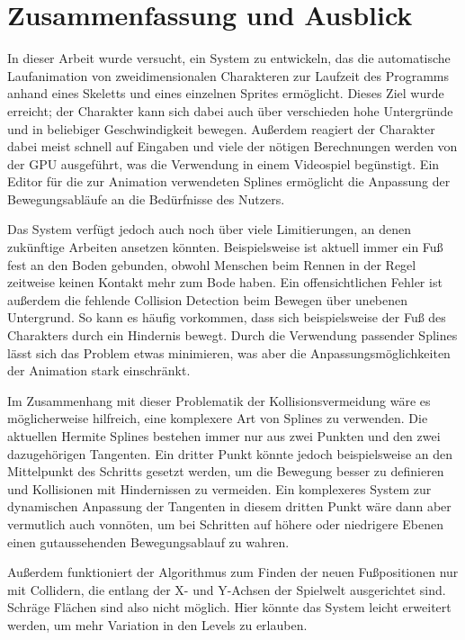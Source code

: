 \chapter{Zusammenfassung und Ausblick} \label{zusammenfassung}
In dieser Arbeit wurde versucht, ein System zu entwickeln, das die automatische Laufanimation von zweidimensionalen Charakteren zur Laufzeit des Programms anhand eines Skeletts und eines einzelnen Sprites ermöglicht. Dieses Ziel wurde erreicht; der Charakter kann sich dabei auch über verschieden hohe Untergründe und in beliebiger Geschwindigkeit bewegen. Außerdem reagiert der Charakter dabei meist schnell auf Eingaben und viele der nötigen Berechnungen werden von der GPU ausgeführt, was die Verwendung in einem Videospiel begünstigt. Ein Editor für die zur Animation verwendeten Splines ermöglicht die Anpassung der Bewegungsabläufe an die Bedürfnisse des Nutzers.

Das System verfügt jedoch auch noch über viele Limitierungen, an denen zukünftige Arbeiten ansetzen könnten. Beispielsweise ist aktuell immer ein Fuß fest an den Boden gebunden, obwohl Menschen beim Rennen in der Regel zeitweise keinen Kontakt mehr zum Bode haben. Ein offensichtlichen Fehler ist außerdem die fehlende Collision Detection beim Bewegen über unebenen Untergrund. So kann es häufig vorkommen, dass sich beispielsweise der Fuß des Charakters durch ein Hindernis bewegt. Durch die Verwendung passender Splines lässt sich das Problem etwas minimieren, was aber die Anpassungsmöglichkeiten der Animation stark einschränkt.

Im Zusammenhang mit dieser Problematik der Kollisionsvermeidung wäre es möglicherweise hilfreich, eine komplexere Art von Splines zu verwenden. Die aktuellen Hermite Splines bestehen immer nur aus zwei Punkten und den zwei dazugehörigen Tangenten. Ein dritter Punkt könnte jedoch beispielsweise an den Mittelpunkt des Schritts gesetzt werden, um die Bewegung besser zu definieren und Kollisionen mit Hindernissen zu vermeiden. Ein komplexeres System zur dynamischen Anpassung der Tangenten in diesem dritten Punkt wäre dann aber vermutlich auch vonnöten, um bei Schritten auf höhere oder niedrigere Ebenen einen gutaussehenden Bewegungsablauf zu wahren.

Außerdem funktioniert der Algorithmus zum Finden der neuen Fußpositionen nur mit Collidern, die entlang der X- und Y-Achsen der Spielwelt ausgerichtet sind. Schräge Flächen sind also nicht möglich. Hier könnte das System leicht erweitert werden, um mehr Variation in den Levels zu erlauben.




